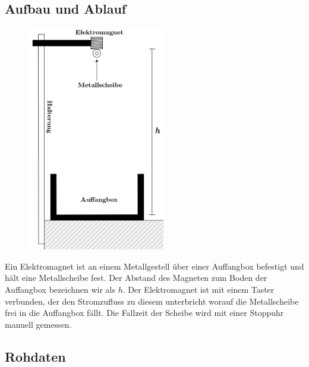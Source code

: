 \documentclass[12pt,a4paper]{article}
\begin{document}
\subsection*{Aufbau und Ablauf}
\begin{figure}
\vspace{-50pt}
\centering
\includegraphics[width=6cm]{experiment.png}
\end{figure}
Ein Elektromagnet ist an einem Metallgestell \"uber einer Auffangbox befestigt und h\"alt eine Metallscheibe fest. Der Abstand des Magneten zum Boden der Auffangbox bezeichnen wir als $h$. Der Elektromagnet ist mit einem Taster verbunden, der den Stromzufluss zu diesem unterbricht worauf die Metallscheibe frei in die Auffangbox f\"allt. Die Fallzeit der Scheibe wird mit einer Stopp\-uhr manuell gemessen.

\subsection*{Rohdaten}
\end{document}
